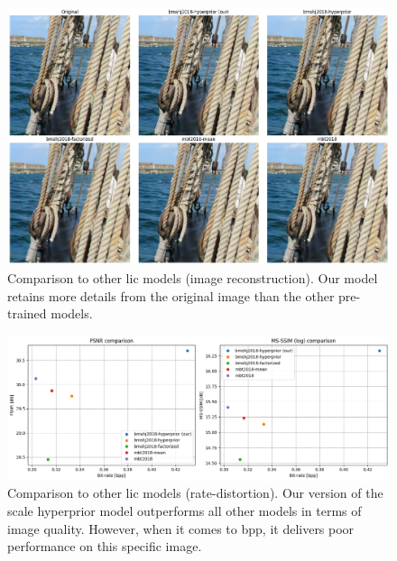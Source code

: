 \begin{figure}
    \centering
    \includegraphics[width=15cm]{img/balle_repro_4.png}
    \caption[Comparison to other \acrshort{lic} models (image reconstruction).]{Comparison to other \acrshort{lic} models (image reconstruction). Our model retains more details from the original image than the other pre-trained models.}
    \label{balle_repro_4}
\end{figure}

\begin{figure}
    \centering
    \includegraphics[width=15cm]{img/balle_repro_5.png}
    \caption[Comparison to other \acrshort{lic} models (rate-distortion).]{Comparison to other \acrshort{lic} models (rate-distortion). Our version of the scale hyperprior model outperforms all other models in terms of image quality. However, when it comes to \acrshort{bpp}, it delivers poor performance on this specific image.}
    \label{balle_repro_5}
\end{figure}

